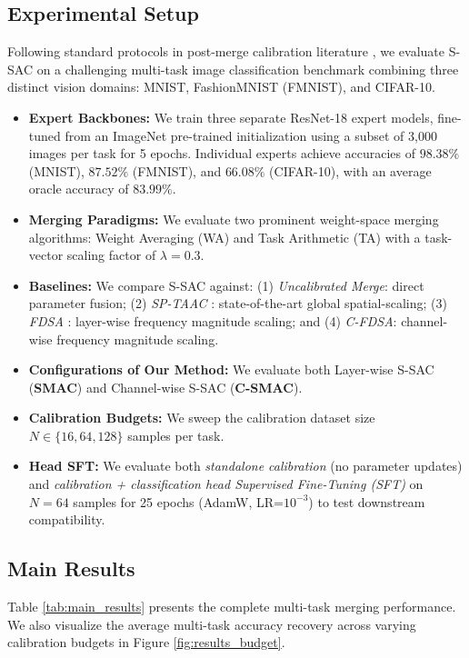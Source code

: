 \documentclass{article}
\theoremstyle{plain}
\theoremstyle{definition}
\theoremstyle{remark}
\begin{document}
\subsection{Experimental Setup}
Following standard protocols in post-merge calibration literature \cite{fdsa2026}, we evaluate S-SAC on a challenging multi-task image classification benchmark combining three distinct vision domains: MNIST, FashionMNIST (FMNIST), and CIFAR-10.
\begin{itemize}
    \item \textbf{Expert Backbones:} We train three separate ResNet-18 expert models, fine-tuned from an ImageNet pre-trained initialization using a subset of 3,000 images per task for 5 epochs. Individual experts achieve accuracies of $98.38\%$ (MNIST), $87.52\%$ (FMNIST), and $66.08\%$ (CIFAR-10), with an average oracle accuracy of $83.99\%$.
    \item \textbf{Merging Paradigms:} We evaluate two prominent weight-space merging algorithms: Weight Averaging (WA) and Task Arithmetic (TA) with a task-vector scaling factor of $\lambda = 0.3$.
    \item \textbf{Baselines:} We compare S-SAC against: (1) \textit{Uncalibrated Merge}: direct parameter fusion; (2) \textit{SP-TAAC} \cite{sptaac2026}: state-of-the-art global spatial-scaling; (3) \textit{FDSA} \cite{fdsa2026}: layer-wise frequency magnitude scaling; and (4) \textit{C-FDSA}: channel-wise frequency magnitude scaling.
    \item \textbf{Configurations of Our Method:} We evaluate both Layer-wise S-SAC (\textbf{SMAC}) and Channel-wise S-SAC (\textbf{C-SMAC}).
    \item \textbf{Calibration Budgets:} We sweep the calibration dataset size $N \in \{16, 64, 128\}$ samples per task.
    \item \textbf{Head SFT:} We evaluate both \textit{standalone calibration} (no parameter updates) and \textit{calibration + classification head Supervised Fine-Tuning (SFT)} on $N=64$ samples for 25 epochs (AdamW, LR=$10^{-3}$) to test downstream compatibility.
\end{itemize}

\subsection{Main Results}
Table \ref{tab:main_results} presents the complete multi-task merging performance. We also visualize the average multi-task accuracy recovery across varying calibration budgets in Figure \ref{fig:results_budget}.
\end{document}
